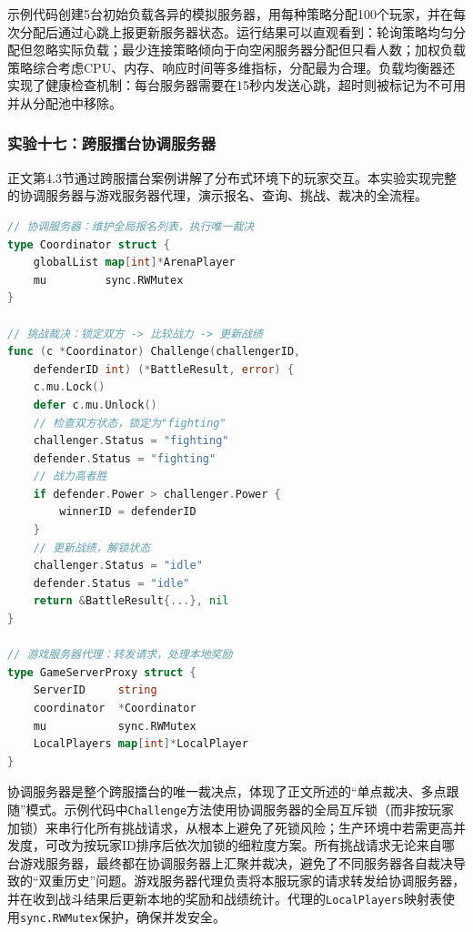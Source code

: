 示例代码创建5台初始负载各异的模拟服务器，用每种策略分配100个玩家，并在每次分配后通过心跳上报更新服务器状态。运行结果可以直观看到：轮询策略均匀分配但忽略实际负载；最少连接策略倾向于向空闲服务器分配但只看人数；加权负载策略综合考虑CPU、内存、响应时间等多维指标，分配最为合理。负载均衡器还实现了健康检查机制：每台服务器需要在15秒内发送心跳，超时则被标记为不可用并从分配池中移除。

\subsubsection{实验十七：跨服擂台协调服务器}

正文第4.3节通过跨服擂台案例讲解了分布式环境下的玩家交互。本实验实现完整的协调服务器与游戏服务器代理，演示报名、查询、挑战、裁决的全流程。

\begin{tcolorbox}[title=协调服务器与游戏服务器代理]
\begin{lstlisting}[style=codeblock, language=go]
// 协调服务器：维护全局报名列表，执行唯一裁决
type Coordinator struct {
    globalList map[int]*ArenaPlayer
    mu         sync.RWMutex
}

// 挑战裁决：锁定双方 -> 比较战力 -> 更新战绩
func (c *Coordinator) Challenge(challengerID,
    defenderID int) (*BattleResult, error) {
    c.mu.Lock()
    defer c.mu.Unlock()
    // 检查双方状态，锁定为"fighting"
    challenger.Status = "fighting"
    defender.Status = "fighting"
    // 战力高者胜
    if defender.Power > challenger.Power {
        winnerID = defenderID
    }
    // 更新战绩，解锁状态
    challenger.Status = "idle"
    defender.Status = "idle"
    return &BattleResult{...}, nil
}

// 游戏服务器代理：转发请求，处理本地奖励
type GameServerProxy struct {
    ServerID     string
    coordinator  *Coordinator
    mu           sync.RWMutex
    LocalPlayers map[int]*LocalPlayer
}
\end{lstlisting}
\end{tcolorbox}

协调服务器是整个跨服擂台的唯一裁决点，体现了正文所述的``单点裁决、多点跟随''模式。示例代码中\texttt{Challenge}方法使用协调服务器的全局互斥锁（而非按玩家加锁）来串行化所有挑战请求，从根本上避免了死锁风险；生产环境中若需更高并发度，可改为按玩家ID排序后依次加锁的细粒度方案。所有挑战请求无论来自哪台游戏服务器，最终都在协调服务器上汇聚并裁决，避免了不同服务器各自裁决导致的``双重历史''问题。游戏服务器代理负责将本服玩家的请求转发给协调服务器，并在收到战斗结果后更新本地的奖励和战绩统计。代理的\texttt{LocalPlayers}映射表使用\texttt{sync.RWMutex}保护，确保并发安全。

